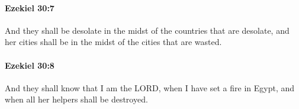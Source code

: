 		\paragraph{Ezekiel 30:7} %
			\label{EZEKIEL-30-7}

			And they shall be desolate in the midst of the countries that are desolate, and her cities shall be in the midst of the cities that are wasted.


		\paragraph{Ezekiel 30:8} %
			\label{EZEKIEL-30-8}

			And they shall know that I am the LORD, when I have set a fire in Egypt, and when all her helpers shall be destroyed.


